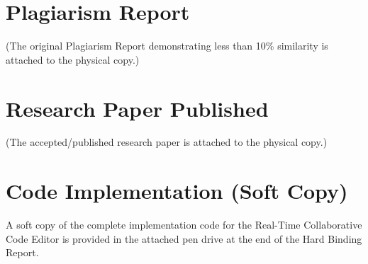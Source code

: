 \documentclass[12pt,a4paper]{report}
\begin{document}
\appendix
\chapter{Plagiarism Report}
(The original Plagiarism Report demonstrating less than 10\% similarity is attached to the physical copy.)

\chapter{Research Paper Published}
(The accepted/published research paper is attached to the physical copy.)

\chapter{Code Implementation (Soft Copy)}
A soft copy of the complete implementation code for the Real-Time Collaborative Code Editor is provided in the attached pen drive at the end of the Hard Binding Report.
\end{document}
